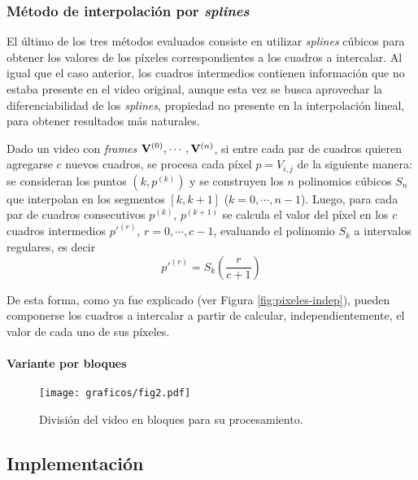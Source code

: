       \subsubsection{Método de interpolación por \emph{splines}}
        El último de los tres métodos evaluados consiste en utilizar \emph{splines} cúbicos para obtener los valores de los píxeles correspondientes a los cuadros a intercalar. Al igual que el caso anterior, los cuadros intermedios contienen información que no estaba presente en el video original, aunque esta vez se busca aprovechar la diferenciabilidad de los \emph{splines}, propiedad no presente en la interpolación lineal, para obtener resultados más naturales.

        Dado un video con \emph{frames} $\mathbf{V}^{(0)}, \cdots, \mathbf{V}^{(n)}$, si entre cada par de cuadros quieren agregarse $c$ nuevos cuadros, se procesa cada píxel $p = {V}_{i,j}$ de la siguiente manera: se consideran los puntos $(k, p^{(k)})$ y se construyen los $n$ polinomios cúbicos $S_n$ que interpolan en los segmentos $[k, k+1]$ ($k = 0, \cdots, n-1$). Luego, para cada par de cuadros consecutivos $p^{(k)}$, $p^{(k+1)}$ se calcula el valor del píxel en los $c$ cuadros intermedios $p'^{(r)}$, $r = 0, \cdots, c-1$, evaluando el polinomio $S_k$ a intervalos regulares, es decir
        \[ p'^{(r)} = S_k \left(\frac{r}{c+1} \right) \]

        De esta forma, como ya fue explicado (ver Figura \ref{fig:pixeles-indep}), pueden componerse los cuadros a intercalar a partir de calcular, independientemente, el valor de cada uno de sus píxeles.

        \paragraph{Variante por bloques}

        \begin{figure}[h]
          \centering

          \texttt{[image: graficos/fig2.pdf]} \vspace{1em} \\

          \caption{División del video en bloques para su procesamiento.}
          \label{fig:spline-bloques}
        \end{figure}


  \subsection{Implementación}

